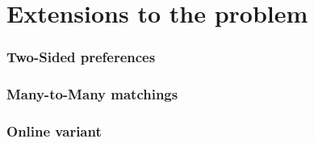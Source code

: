 \section{Extensions to the problem}
\subsubsection{Two-Sided preferences}
\subsubsection{Many-to-Many matchings}
\subsubsection{Online variant}